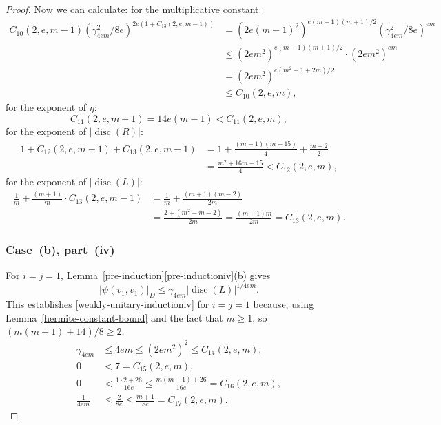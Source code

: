 \documentclass[11pt]{article}
\numberwithin{equation}{section}
\DeclareMathOperator{\disc}{disc}
\newcommand{\abs}[1]{\lvert #1 \rvert}
\begin{document}
\begin{proof}
Now we can calculate:
for the multiplicative constant:
\begin{align*}
C_{10}(2,e,m-1) (\gamma_{4em}^2/8e)^{2e(1+C_{13}(2,e,m-1))}
& = (2e(m-1)^2)^{e(m-1)(m+1)/2} (\gamma_{4em}^2/8e)^{em}
\\& \leq (2em^2)^{e(m-1)(m+1)/2} \cdot (2em^2)^{em}
\\& = (2em^2)^{e(m^2-1 + 2m)/2}
\\& \leq C_{10}(2,e,m),
\end{align*}
for the exponent of $\eta$:
\[
C_{11}(2,e,m-1) = 14e(m-1) < C_{11}(2,e,m),
\]
for the exponent of $\abs{\disc(R)}$:
\begin{align*}
1 + C_{12}(2,e,m-1) + C_{13}(2,e,m-1)
& = 1 + \frac{(m-1)(m+15)}{4} + \frac{m-2}{2}
\\& = \frac{m^2+16m-15}{4} < C_{12}(2,e,m),
\end{align*}
for the exponent of $\abs{\disc(L)}$:
\begin{align*}
\frac{1}{m} + \frac{(m+1)}{m} \cdot C_{13}(2,e,m-1)
& = \frac{1}{m} + \frac{(m+1)(m-2)}{2m}
\\& = \frac{2+(m^2-m-2)}{2m} = \frac{(m-1)m}{2m} = C_{13}(2,e,m).
\end{align*}

\subsubsection*{Case~(b), part~(iv)}
For $i=j=1$, Lemma~\ref{pre-induction}\eqref{pre-inductioniv}(b) gives
\begin{equation} \label{eqn:case-b-iv-base}
\abs{\psi(v_1, v_1)}_D \leq \gamma_{4em} \abs{\disc(L)}^{1/4em}.
\end{equation}
This establishes \eqref{weakly-unitary-inductioniv} for $i=j=1$ because, using Lemma~\ref{hermite-constant-bound} and the fact that $m \geq 1$, so $(m(m+1)+14)/8 \geq 2$,
\begin{align*}
\gamma_{4em}
& \leq 4em \leq (2em^2)^2 \leq C_{14}(2,e,m),
\\[3pt] 0 & < 7 = C_{15}(2,e,m),
\\ 0 & < \frac{1 \cdot 2 + 26}{16e} \leq \frac{m(m+1)+26}{16e} = C_{16}(2,e,m),
\\ \frac{1}{4em} & \leq \frac{2}{8e} \leq \frac{m+1}{8e} = C_{17}(2,e,m).
\end{align*}


\end{proof}
\end{document}
